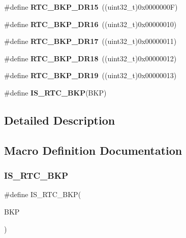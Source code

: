 \begin{DoxyCompactItemize}
\item 
\#define \textbf{ R\+T\+C\+\_\+\+B\+K\+P\+\_\+\+D\+R15}~((uint32\+\_\+t)0x0000000\+F)
\item 
\#define \textbf{ R\+T\+C\+\_\+\+B\+K\+P\+\_\+\+D\+R16}~((uint32\+\_\+t)0x00000010)
\item 
\#define \textbf{ R\+T\+C\+\_\+\+B\+K\+P\+\_\+\+D\+R17}~((uint32\+\_\+t)0x00000011)
\item 
\#define \textbf{ R\+T\+C\+\_\+\+B\+K\+P\+\_\+\+D\+R18}~((uint32\+\_\+t)0x00000012)
\item 
\#define \textbf{ R\+T\+C\+\_\+\+B\+K\+P\+\_\+\+D\+R19}~((uint32\+\_\+t)0x00000013)
\item 
\#define \textbf{ I\+S\+\_\+\+R\+T\+C\+\_\+\+B\+KP}(B\+KP)
\end{DoxyCompactItemize}


\subsection{Detailed Description}


\subsection{Macro Definition Documentation}
\mbox{\label{group__RTC__Backup__Registers__Definitions_ga7dfcd70f7d46d2a71155b4e4e12d0a60}} 
\subsubsection{I\+S\+\_\+\+R\+T\+C\+\_\+\+B\+KP}
{\footnotesize\ttfamily \#define I\+S\+\_\+\+R\+T\+C\+\_\+\+B\+KP(\begin{DoxyParamCaption}\item[{}]{B\+KP }\end{DoxyParamCaption})}


